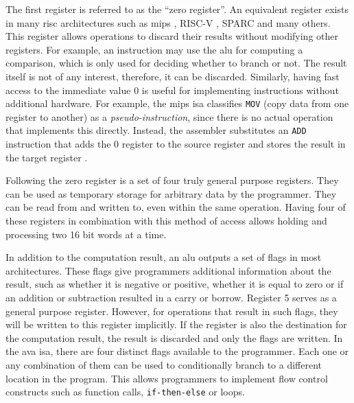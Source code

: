 The first register is referred to as the ``zero register''. An equivalent register exists in many \ac{risc} architectures such as \ac{mips} \cite{mips1995}, RISC-V \cite{riscv_specs}, SPARC \cite{sparc_specs} and many others. This register allows operations to discard their results without modifying other registers. For example, an instruction may use the \ac{alu} for computing a comparison, which is only used for deciding whether to branch or not. The result itself is not of any interest, therefore, it can be discarded. Similarly, having fast access to the immediate value 0 is useful for implementing instructions without additional hardware. For example, the \ac{mips} \ac{isa} classifies \texttt{MOV} (copy data from one register to another) as a \textit{pseudo-instruction}, since there is no actual operation that implements this directly. Instead, the assembler substitutes an \texttt{ADD} instruction that adds the 0 register to the source register and stores the result in the target register \cite{mips1995}.

Following the zero register is a set of four truly general purpose registers. They can be used as temporary storage for arbitrary data by the programmer. They can be read from and written to, even within the same operation. Having four of these registers in combination with this method of access allows holding and processing two 16 bit words at a time.

In addition to the computation result, an \ac{alu} outputs a set of flags in most architectures. These flags give programmers additional information about the result, such as whether it is negative or positive, whether it is equal to zero or if an addition or subtraction resulted in a carry or borrow. Register 5 serves as a general purpose register. However, for operations that result in such flags, they will be written to this register implicitly. If the register is also the destination for the computation result, the result is discarded and only the flags are written. In the \ac{ava} \ac{isa}, there are four distinct flags available to the programmer. Each one or any combination of them can be used to conditionally branch to a different location in the program. This allows programmers to implement flow control constructs such as function calls, \texttt{if-then-else} or loops.

